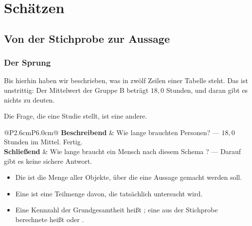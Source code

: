 \part{Schätzen}

\chapter{Von der Stichprobe zur Aussage}

\section{Der Sprung}

Bis hierhin haben wir beschrieben, was in zwölf Zeilen einer Tabelle steht. Das ist unstrittig: Der Mittelwert der Gruppe B beträgt $18{,}0$ Stunden, und daran gibt es nichts zu deuten.

Die Frage, die eine Studie stellt, ist eine andere.

\begin{merksatz}
\begin{center}
\renewcommand{\arraystretch}{1.55}
\begin{tabular}{@{}P{2.6cm}P{6.0cm}@{}}
\toprule
\textbf{Beschreibend} & Wie lange brauchten  Personen? --- $18{,}0$ Stunden im Mittel. Fertig.\\
\textbf{Schließend} & Wie lange braucht ein Mensch nach diesem Schema ? --- Darauf gibt es keine sichere Antwort.\\
\bottomrule
\end{tabular}
\end{center}

\begin{center}
\begin{minipage}{0.88\textwidth}
\end{minipage}
\end{center}
\end{merksatz}

\begin{definition}
\begin{itemize}[leftmargin=1.4em, itemsep=4pt]
\item Die  ist die Menge aller Objekte, über die eine Aussage gemacht werden soll.
\item Eine  ist eine Teilmenge davon, die tatsächlich untersucht wird.
\item Eine Kennzahl der Grundgesamtheit heißt ; eine aus der Stichprobe berechnete heißt  oder .
\end{itemize}
\end{definition}

